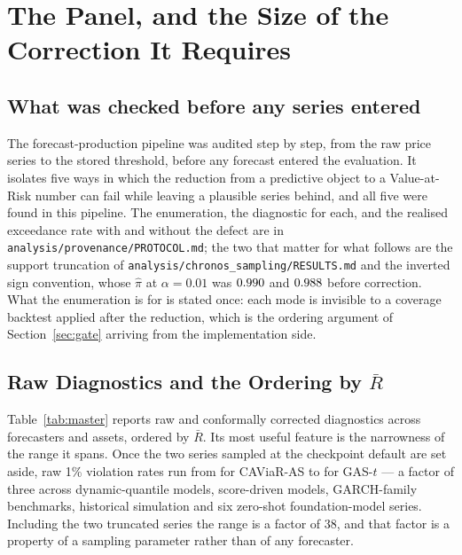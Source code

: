\documentclass[preprint,11pt,authoryear]{elsarticle}
\newcommand{\1}{\boldsymbol{1}}
\begin{document}
\section{The Panel, and the Size of the Correction It Requires}
\label{sec:results}

\subsection{What was checked before any series entered}
\label{sec:audit_trail}

The forecast-production pipeline was audited step by step, from the raw price
series to the stored threshold, before any forecast entered the evaluation. It
isolates five ways in which the reduction from a predictive object to a
Value-at-Risk number can fail while leaving a plausible series behind, and all
five were found in this pipeline. The enumeration, the diagnostic for each, and
the realised exceedance rate with and without the defect are in
\texttt{analysis/provenance/PROTOCOL.md}; the two that matter for what follows are the support
truncation of \texttt{analysis/chronos\_sampling/RESULTS.md} and the inverted sign convention, whose
$\hat\pi$ at $\alpha = 0.01$ was $0.990$ and
$0.988$ before correction. What the enumeration is for is
stated once: each mode is invisible to a coverage backtest applied after the
reduction, which is the ordering argument of Section~\ref{sec:gate} arriving
from the implementation side.

\subsection{\texorpdfstring{Raw Diagnostics and the Ordering by $\bar R$}{Raw Diagnostics and the Ordering by R}}
\label{sec:results_raw}

Table~\ref{tab:master} reports raw and conformally corrected diagnostics across
\nMainForecasters{} forecasters and \nMainAssets{} assets, ordered by $\bar R$. Its most useful feature is the
narrowness of the range it spans. Once the two series sampled at the checkpoint default are set
aside, raw 1\% violation rates run from \nMainRawPiMin{} for CAViaR-AS to \nMainRawPiMax{} for GAS-$t$
--- a factor of three across dynamic-quantile models, score-driven models,
GARCH-family benchmarks, historical simulation and six zero-shot foundation-model
series. Including the two truncated series the range is a factor of 38, and that
factor is a property of a sampling parameter rather than of any forecaster.
\end{document}
